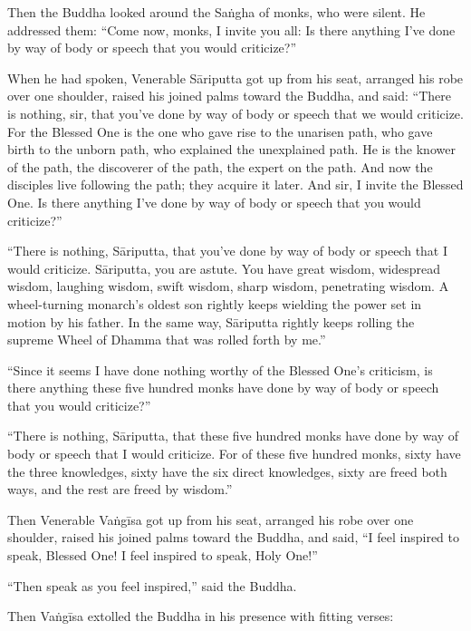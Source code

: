 \documentclass[12pt,openany]{book}%
\begin{document}
Then the Buddha looked around the \textsanskrit{Saṅgha} of monks, who were silent. He addressed them: “Come now, monks, I invite you all: Is there anything I’ve done by way of body or speech that you would criticize?” 

When he had spoken, Venerable \textsanskrit{Sāriputta} got up from his seat, arranged his robe over one shoulder, raised his joined palms toward the Buddha, and said: “There is nothing, sir, that you’ve done by way of body or speech that we would criticize. For the Blessed One is the one who gave rise to the unarisen path, who gave birth to the unborn path, who explained the unexplained path. He is the knower of the path, the discoverer of the path, the expert on the path. And now the disciples live following the path; they acquire it later. And sir, I invite the Blessed One. Is there anything I’ve done by way of body or speech that you would criticize?” 

“There is nothing, \textsanskrit{Sāriputta}, that you’ve done by way of body or speech that I would criticize. \textsanskrit{Sāriputta}, you are astute. You have great wisdom, widespread wisdom, laughing wisdom, swift wisdom, sharp wisdom, penetrating wisdom. A wheel-turning monarch’s oldest son rightly keeps wielding the power set in motion by his father. In the same way, \textsanskrit{Sāriputta} rightly keeps rolling the supreme Wheel of Dhamma that was rolled forth by me.” 

“Since it seems I have done nothing worthy of the Blessed One’s criticism, is there anything these five hundred monks have done by way of body or speech that you would criticize?” 

“There is nothing, \textsanskrit{Sāriputta}, that these five hundred monks have done by way of body or speech that I would criticize. For of these five hundred monks, sixty have the three knowledges, sixty have the six direct knowledges, sixty are freed both ways, and the rest are freed by wisdom.” 

Then Venerable \textsanskrit{Vaṅgīsa} got up from his seat, arranged his robe over one shoulder, raised his joined palms toward the Buddha, and said, “I feel inspired to speak, Blessed One! I feel inspired to speak, Holy One!” 

“Then speak as you feel inspired,” said the Buddha. 

Then \textsanskrit{Vaṅgīsa} extolled the Buddha in his presence with fitting verses: 
\end{document}
